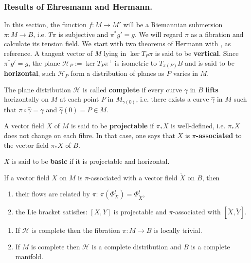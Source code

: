 \subsubsection{Results of Ehresmann and Hermann.}
\label{sec:orgbe54d73}
In this section, the function \(f: M \longrightarrow M'\) will be a Riemannian submersion \(\pi: M \longrightarrow B\), i.e. \(T\pi\) is subjective and \(\pi^*g' = g\). We will
regard \(\pi\) as a fibration and calculate its tension field. We start with two theorems
of Hermann with \cite{besse_einstein_1987}, as reference. A tangent vector of \(M\) lying
in \(\ker T_P\pi\) is said to be \textbf{vertical}. Since \(\pi^* g' = g\), the plane \(\mathcal{H}_P := \ker T_P\pi^\perp\) is isometric to \(T_{\pi(P)}B\) and is said to be
\textbf{horizontal}, such \(\mathcal{H}_P\) form a distribution of planes as \(P\) varies in
\(M\).

\begin{definition}
The plane distribution \(\mathcal{H}\) is called \textbf{complete} if every curve \(\gamma\) in \(B\)
\textbf{lifts} horizontally on \(M\) at each point \(P\) in \(M_{\gamma(0)}\), i.e. there exists a curve \(\hat \gamma\) in \(M\)
such that \(\pi\circ\hat\gamma = \gamma\) and \(\hat\gamma(0)=P\in M\).

A vector field \(X\) of \(M\) is said to be \textbf{projectable} if \(\pi_* X\) is
well-defined, i.e. \(\pi_* X\) does not change on each fibre.  In that case, one says that \(X\) is \textbf{\(\pi\)-associated} to the vector field \(\pi_* X\) of \(B\).

\(X\) is said to be \textbf{basic} if it is projectable and horizontal.  
\end{definition}

\begin{remark}
If a vector field \(X\) on \(M\) is \(\pi\)-associated with a vector field \(\check X\) on \(B\), then
\begin{enumerate}
\item their flows are related by \(\pi\): \(\pi(\Phi_X^t)
   = \Phi_{\check X}^t\),
\item the Lie bracket satisfies: \([X,Y]\) is projectable and \(\pi\)-associated with \([\check X,\check Y]\).
\end{enumerate}
\end{remark}






\begin{theorem}
\label{thm:Ehresmann-Hermann}
\begin{enumerate}
\item If \(\mathcal{H}\) is complete then the fibration \(\pi: M \longrightarrow B\) is
locally trivial.
\item If \(M\) is complete then \(\mathcal{H}\) is a complete distribution and \(B\) is
a complete manifold.
\end{enumerate}
\end{theorem}


